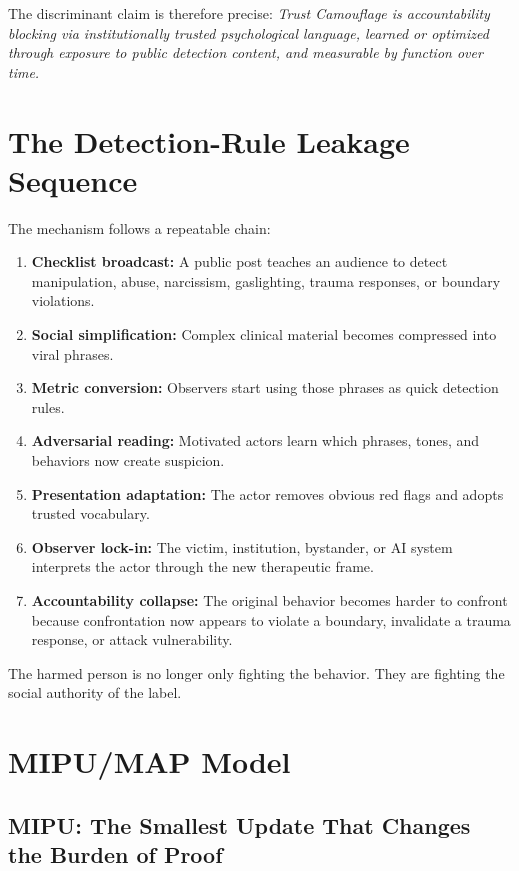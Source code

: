 \documentclass[11pt, letterpaper]{article}
\newcommand{\term}[1]{\textbf{#1}}
\begin{document}
The discriminant claim is therefore precise: \textit{Trust Camouflage is accountability blocking via institutionally trusted psychological language, learned or optimized through exposure to public detection content, and measurable by function over time.}

\section{The Detection-Rule Leakage Sequence}

The mechanism follows a repeatable chain:

\begin{enumerate}
    \item \term{Checklist broadcast:} A public post teaches an audience to detect manipulation, abuse, narcissism, gaslighting, trauma responses, or boundary violations.
    \item \term{Social simplification:} Complex clinical material becomes compressed into viral phrases.
    \item \term{Metric conversion:} Observers start using those phrases as quick detection rules.
    \item \term{Adversarial reading:} Motivated actors learn which phrases, tones, and behaviors now create suspicion.
    \item \term{Presentation adaptation:} The actor removes obvious red flags and adopts trusted vocabulary.
    \item \term{Observer lock-in:} The victim, institution, bystander, or AI system interprets the actor through the new therapeutic frame.
    \item \term{Accountability collapse:} The original behavior becomes harder to confront because confrontation now appears to violate a boundary, invalidate a trauma response, or attack vulnerability.
\end{enumerate}

The harmed person is no longer only fighting the behavior. They are fighting the social authority of the label.

\section{MIPU/MAP Model}

\subsection{MIPU: The Smallest Update That Changes the Burden of Proof}
\end{document}
